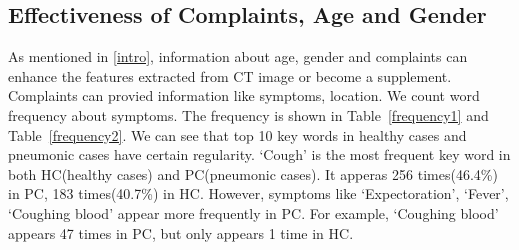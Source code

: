 \subsection{Effectiveness of Complaints, Age and Gender}
\label{complaintsagegender}
As mentioned in \ref{intro}, information about age, gender and complaints can enhance the features extracted from CT image or become a supplement. Complaints can provied information like symptoms, location.
We count word frequency about symptoms. The frequency is shown in Table~\ref{frequency1} and Table~\ref{frequency2}. We can see that top 10 key words in healthy cases and pneumonic cases have certain regularity. `Cough' is the most frequent key word in both HC(healthy cases) and PC(pneumonic cases). It apperas 256 times(46.4\%) in PC, 183 times(40.7\%) in HC. However, symptoms like `Expectoration', `Fever', `Coughing blood' appear more frequently in PC. For example, `Coughing blood' appears 47 times in PC, but only appears 1 time in HC.


